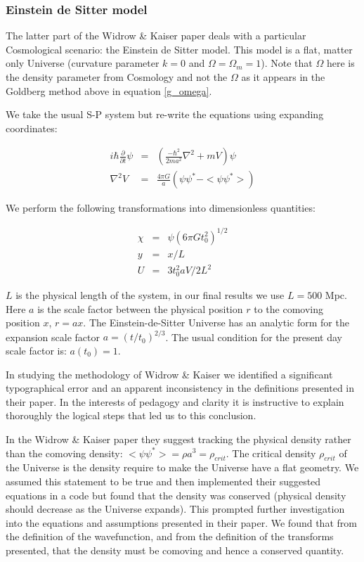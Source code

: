 \subsubsection{Einstein de Sitter model}
The latter part of the Widrow \& Kaiser paper deals with a particular Cosmological scenario: the Einstein de Sitter model. This model is a flat, matter only Universe (curvature parameter $k = 0$ and $\Omega = \Omega_m = 1$). Note that $\Omega$ here is the density parameter from Cosmology and not the $\Omega$ as it appears in the Goldberg method above in equation \ref{g_omega}.

We take the usual S-P system but re-write the equations using expanding coordinates:

\begin{eqnarray}
 i \hbar \frac{\partial}{\partial t} \psi &=& \left(\frac{-\hbar^2}{2 m a^2} \nabla^2 +mV\right) \psi \\
 \nabla^2 V &=&  \frac{4\pi G}{a} (\psi\psi^* - <\psi \psi^*>)
\end{eqnarray}

\noindent We perform the following transformations into dimensionless quantities:

\begin{eqnarray}
\chi &=& \psi (6 \pi G t_0^2 )^{1/2} \\
y &=& x/L \\
U &=& 3 t_0^2 a V / 2L^2
\end{eqnarray}

\noindent $L$ is the physical length of the system, in our final results we use $ L = 500$ Mpc. Here $a$ is the scale factor between the physical position $r$ to the comoving position $x$, $r = a x$. The Einstein-de-Sitter Universe has an analytic form for the expansion scale factor $a = (t/t_0)^{2/3}$. The usual condition for the present day scale factor is: $a(t_0) = 1$.

In studying the methodology of Widrow \& Kaiser we identified a significant typographical error and an apparent inconsistency in the definitions presented in their paper. In the interests of pedagogy and clarity it is instructive to explain thoroughly the logical steps that led us to this conclusion.

In the Widrow \& Kaiser paper they suggest tracking the physical density rather than the comoving density:  $<\psi \psi^*>  = \rho a^3 = \rho_{crit}$. The critical density $\rho_{crit}$ of the Universe is the density require to make the Universe have a flat geometry. We assumed this statement to be true and then implemented their suggested equations in a code but found that the density was conserved (physical density should decrease as the Universe expands). This prompted further investigation into the equations and assumptions presented in their paper. We found that from the definition of the wavefunction, and from the definition of the transforms presented, that the density must be comoving and hence a conserved quantity.

